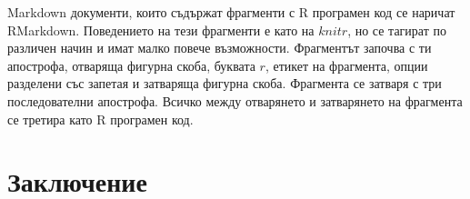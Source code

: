 Markdown документи, които съдържат фрагменти с R програмен код се наричат RMarkdown. Поведението на тези фрагменти е като на $knitr$, но се тагират по различен начин и имат малко повече възможности. Фрагментът започва с ти апострофа, отваряща фигурна скоба, буквата $r$, етикет на фрагмента, опции разделени със запетая и затваряща фигурна скоба. Фрагмента се затваря с три последователни апострофа. Всичко между отварянето и затварянето на фрагмента се третира като R програмен код. 

\section*{Заключение}


